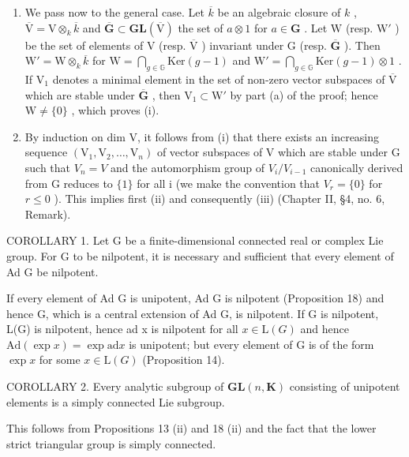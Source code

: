 \begin{enumerate}
\def\labelenumi{(\alph{enumi})}
\setcounter{enumi}{1}
\item
  We pass now to the general case. Let \(\overline{k}\) be an algebraic closure of \(k\) , \(\overline{\mathrm{V}} = \mathrm{V} \otimes_k \overline{k}\) and \(\overline{\mathbf{G}} \subset \mathbf{GL}(\overline{\mathrm{V}})\) the set of \(a \otimes 1\) for \(a \in \mathbf{G}\) . Let \(\mathrm{W}\) (resp. \(\mathrm{W}'\) ) be the set of elements of \(\mathrm{V}\) (resp. \(\overline{\mathrm{V}}\) ) invariant under \(\mathrm{G}\) (resp. \(\overline{\mathbf{G}}\) ). Then \(\mathrm{W}' = \mathrm{W} \otimes_k \overline{k}\) for \(\mathrm{W} = \bigcap_{g \in \mathbb{G}} \mathrm{Ker}(g - 1)\) and \(\mathrm{W}' = \bigcap_{g \in \mathbb{G}} \mathrm{Ker}(g - 1) \otimes 1\) . If \(\mathrm{V}_1\) denotes a minimal element in the set of non-zero vector subspaces of \(\overline{\mathrm{V}}\) which are stable under \(\overline{\mathbf{G}}\) , then \(\mathrm{V}_1 \subset \mathrm{W}'\) by part (a) of the proof; hence \(\mathrm{W} \neq \{0\}\) , which proves (i).
\item
  By induction on dim V, it follows from (i) that there exists an increasing sequence \(\left(\mathrm{V}_{1},\mathrm{V}_{2},\ldots,\mathrm{V}_{n}\right)\) of vector subspaces of V which are stable under G such that \(V_{n}=V\) and the automorphism group of \(V_{i}/V_{i-1}\) canonically derived from G reduces to \(\{1\}\) for all i (we make the convention that \(V_{r}=\{0\}\) for \(r\leqslant0\) ). This implies first (ii) and consequently (iii) (Chapter II, §4, no. 6, Remark).
\end{enumerate}

COROLLARY 1. Let G be a finite-dimensional connected real or complex Lie group. For G to be nilpotent, it is necessary and sufficient that every element of Ad G be nilpotent.

If every element of Ad G is unipotent, Ad G is nilpotent (Proposition 18) and hence G, which is a central extension of Ad G, is nilpotent. If G is nilpotent, L(G) is nilpotent, hence ad x is nilpotent for all \(x \in \mathrm{L}(G)\) and hence \(\mathrm{Ad}(\exp x) = \exp \mathrm{ad} x\) is unipotent; but every element of G is of the form \(\exp x\) for some \(x \in \mathrm{L}(G)\) (Proposition 14).

COROLLARY 2. Every analytic subgroup of \(\mathbf{GL}(n, \mathbf{K})\) consisting of unipotent elements is a simply connected Lie subgroup.

This follows from Propositions 13 (ii) and 18 (ii) and the fact that the lower strict triangular group is simply connected.

